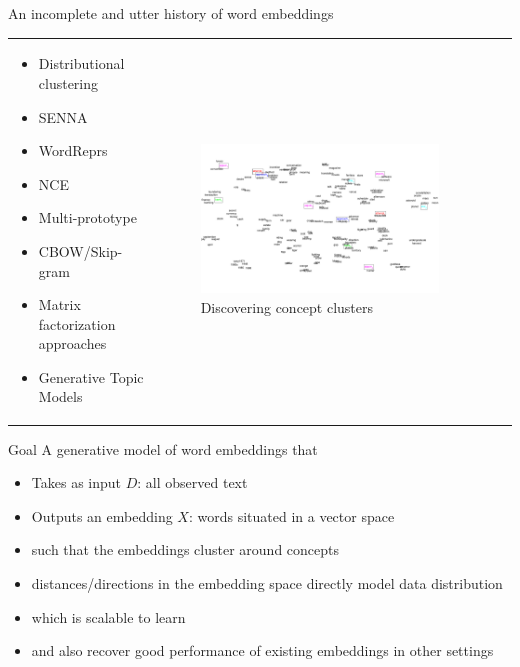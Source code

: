 \documentclass{beamer}
\begin{document}
\begin{frame}{An incomplete and utter history of word embeddings}
\begin{tabular}{p{}p{}}
 \begin{minipage}{.48\textwidth}
  \begin{itemize}
    \item Distributional clustering \cite{Lillian}
    \item SENNA \cite{Collobert}
    \item WordReprs \cite{Turian}
    \item NCE \cite{Mnih}
    \item Multi-prototype \cite{Socher}
    \item CBOW/Skip-gram \cite{CBOW}
    \item Matrix factorization approaches \cite{Moitra}
    \item Generative Topic Models \cite{LDA}
  \end{itemize}
\end{minipage}
&
\begin{minipage}{.48\textwidth}
\begin{figure}[h!]
  \caption{Discovering concept clusters \cite{Socher}}
  \centering
    \includegraphics[width=0.9\textwidth]{MultipleVectorWordEmbedding.pdf}
\end{figure}
\end{minipage}
\end{tabular}
\end{frame}

\begin{frame}{Goal}
A generative model of word embeddings that
\begin{itemize}
\item Takes as input $D$: all observed text
\item Outputs an embedding $X$: words situated in a vector space
\item such that the embeddings cluster around concepts
\item distances/directions in the embedding space directly model data distribution
\item which is scalable to learn
\item and also recover good performance of existing embeddings in other settings
\end{itemize}
\end{frame}
\end{document}
